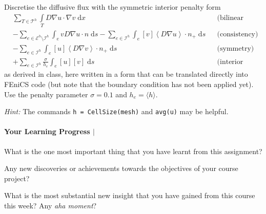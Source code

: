 \documentclass[10pt,letterpaper]{scrartcl}
\newcommand{\dx}{\;\mathrm{d}x}
\newcommand{\ds}{\;\mathrm{d}s}
\begin{document}
Discretise the diffusive flux with the symmetric interior penalty form
\begin{align*}
&\sum_{T\in\mathcal{T}^h} \int\limits_T D\nabla u \cdot \nabla v \dx && \text{(bilinear form of conforming methods)}\\
&- \sum_{e\in\mathcal{E}^h\setminus\mathcal{I}^h} \int_e vD\nabla u \cdot n \ds - \sum_{e\in\mathcal{I}^h} \int_e [v]\left\langle D\nabla u\right\rangle\cdot n_+ \ds && \text{(consistency)}\\
&- \sum_{e\in\mathcal{I}^h} \int_e [u]\left\langle D\nabla v\right\rangle\cdot n_+ \ds && \text{(symmetry)}\\
&+ \sum_{e\in\mathcal{I}^h} \frac{\sigma}{h_e} \int_e [u] [v] \ds && \text{(interior penalty)}
\end{align*}
as derived in class, here written in a form that can be translated directly into \textsf{FEniCS} code (but note that the boundary condition has not been applied yet). Use the penalty parameter $\sigma = 0.1$ and $h_e = \langle h \rangle$.

\emph{Hint:} The commands \verb|h = CellSize(mesh)| and \verb|avg(u)| may be helpful.

\paragraph*{Your Learning Progress $\vert$ \faFilePdfO}

What is the one most important thing that you have learnt from this assignment?

\vspace*{3mm}
\hrulefill

\vspace*{3mm}
\hrulefill

Any new discoveries or achievements towards the objectives of your course project?

\vspace*{3mm}
\hrulefill

\vspace*{3mm}
\hrulefill

What is the most substantial new insight that you have gained from this course this week? Any \emph{aha moment}?

\vspace*{3mm}
\hrulefill

\vspace*{3mm}
\hrulefill
\end{document}
